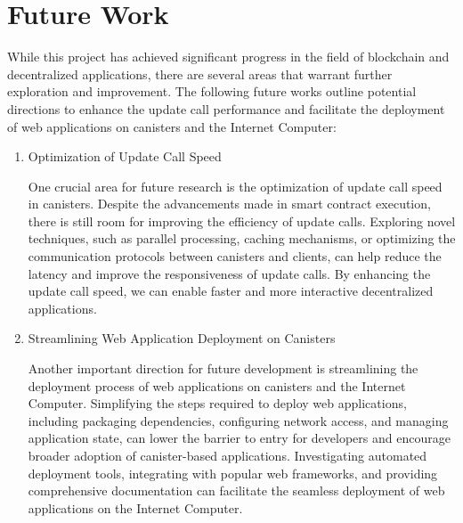 \section{Future Work}
While this project has achieved significant progress in the field of blockchain and decentralized applications, there are several areas that warrant further exploration and improvement. The following future works outline potential directions to enhance the update call performance and facilitate the deployment of web applications on canisters and the Internet Computer:

\begin{enumerate}
    
    \item Optimization of Update Call Speed
    
One crucial area for future research is the optimization of update call speed in canisters. Despite the advancements made in smart contract execution, there is still room for improving the efficiency of update calls. Exploring novel techniques, such as parallel processing, caching mechanisms, or optimizing the communication protocols between canisters and clients, can help reduce the latency and improve the responsiveness of update calls. By enhancing the update call speed, we can enable faster and more interactive decentralized applications.


    \item Streamlining Web Application Deployment on Canisters
    
Another important direction for future development is streamlining the deployment process of web applications on canisters and the Internet Computer. Simplifying the steps required to deploy web applications, including packaging dependencies, configuring network access, and managing application state, can lower the barrier to entry for developers and encourage broader adoption of canister-based applications. Investigating automated deployment tools, integrating with popular web frameworks, and providing comprehensive documentation can facilitate the seamless deployment of web applications on the Internet Computer.
\end{enumerate}
